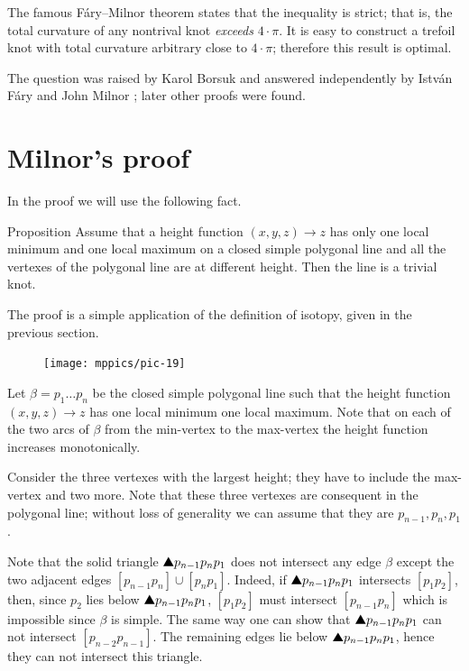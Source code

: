 The famous F\'ary--Milnor theorem states that the inequality is strict;
that is, the total curvature of any nontrival knot \emph{exceeds} $4\cdot\pi$.
It is easy to construct a trefoil knot with total curvature arbitrary close to $4\cdot\pi$;
therefore this result is optimal.

The question was raised by Karol Borsuk \cite{borsuk} and answered independently by Istv\'an F\'ary and John Milnor \cite{fary, milnor};
later other proofs were found.

\section{Milnor's proof}

In the proof we will use the following fact. 

\begin{thm}{Proposition}\label{prop:one-max-one-min}
Assume that a height function $(x,y,z)\to z$ 
has only one local minimum and one local maximum on a closed simple polygonal line and all the vertexes of the polygonal line are at different height.
Then the line is a trivial knot.
\end{thm}

The proof is a simple application of the definition of isotopy, given in the previous section. 

\begin{figure}
\vskip-0mm
\centering
\texttt{[image: mppics/pic-19]}
\vskip0mm
\end{figure}

Let $\beta=p_1\dots p_n$ be the closed simple polygonal line
such that the height function $(x,y,z)\to z$ has one local minimum one local maximum.
Note that on each of the two arcs of $\beta$ from the min-vertex to the max-vertex the height function increases monotonically.

Consider the three vertexes with the largest height;
they have to include the max-vertex and two more.
Note that these three vertexes are consequent in the polygonal line; 
without loss of generality we can assume that they are $p_{n-1},p_n,p_1$.

Note that the solid triangle $\solidtriangle p_{n-1}p_np_1$ does not intersect any edge $\beta$ except the two adjacent edges $[p_{n-1}p_n]\cup[p_np_1]$.
Indeed, if $\solidtriangle p_{n-1}p_np_1$ intersects $[p_1p_2]$,
then, 
since $p_2$ lies below $\solidtriangle p_{n-1}p_np_1$,
$[p_1p_2]$ must intersect $[p_{n-1}p_n]$
which is impossible since $\beta$ is simple.
The same way one can show that $\solidtriangle p_{n-1}p_np_1$ can not intersect $[p_{n-2}p_{n-1}]$.
The remaining edges lie below $\solidtriangle p_{n-1}p_np_1$, hence they can not intersect this triangle.

